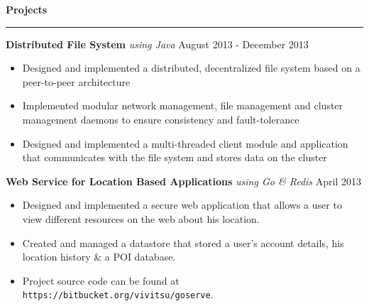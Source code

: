 \documentclass[10pt]{article}
\begin{document}
\textbf{Projects}
\smallskip
\hrule
\textbf{Distributed File System} \textit{using Java} \hfill August 2013 - December 2013
\begin{itemize}
    \item Designed and implemented a distributed, decentralized file system based on a peer-to-peer architecture
    \item Implemented modular network management, file management and cluster management daemons to ensure consistency and fault-tolerance
    \item Designed and implemented a multi-threaded client module and application that communicates with the file system and stores data on the cluster
\end{itemize}
\textbf{Web Service for Location Based Applications} \textit{using Go \& Redis} \hfill April 2013
\begin{itemize}
    \item Designed and implemented a secure web application that allows a user to view different resources on the web about his location.
    \item Created and managed a datastore that stored a user's account details, his location history \& a POI database.
    \item Project source code can be found at \texttt{https://bitbucket.org/vivitsu/goserve}.
\end{itemize}
\end{document}
